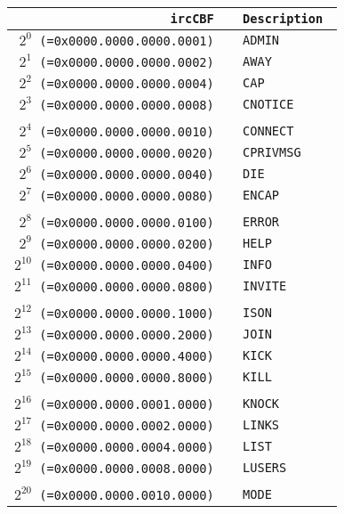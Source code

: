 \documentclass[documentation]{subfiles}
\begin{document}
\begin{minipage}{.48\textwidth}
    \small
    \begin{longtable}{>{\tt}r>{\tt}l}
        \toprule
        {\bf ircCBF} & {\bf Description} \\
        \midrule\endhead%
        $2^{0}$  (=0x0000.0000.0000.0001) & ADMIN        \\
        $2^{1}$  (=0x0000.0000.0000.0002) & AWAY         \\
        $2^{2}$  (=0x0000.0000.0000.0004) & CAP          \\
        $2^{3}$  (=0x0000.0000.0000.0008) & CNOTICE      \\
        \\
        $2^{4}$  (=0x0000.0000.0000.0010) & CONNECT      \\
        $2^{5}$  (=0x0000.0000.0000.0020) & CPRIVMSG     \\
        $2^{6}$  (=0x0000.0000.0000.0040) & DIE          \\
        $2^{7}$  (=0x0000.0000.0000.0080) & ENCAP        \\
        \\
        $2^{8}$  (=0x0000.0000.0000.0100) & ERROR        \\
        $2^{9}$  (=0x0000.0000.0000.0200) & HELP         \\
        $2^{10}$ (=0x0000.0000.0000.0400) & INFO         \\
        $2^{11}$ (=0x0000.0000.0000.0800) & INVITE       \\
        \\
        $2^{12}$ (=0x0000.0000.0000.1000) & ISON         \\
        $2^{13}$ (=0x0000.0000.0000.2000) & JOIN         \\
        $2^{14}$ (=0x0000.0000.0000.4000) & KICK         \\
        $2^{15}$ (=0x0000.0000.0000.8000) & KILL         \\
        \\
        $2^{16}$ (=0x0000.0000.0001.0000) & KNOCK        \\
        $2^{17}$ (=0x0000.0000.0002.0000) & LINKS        \\
        $2^{18}$ (=0x0000.0000.0004.0000) & LIST         \\
        $2^{19}$ (=0x0000.0000.0008.0000) & LUSERS       \\
        \\
        $2^{20}$ (=0x0000.0000.0010.0000) & MODE         \\

\end{longtable}
\end{minipage}
\end{document}
